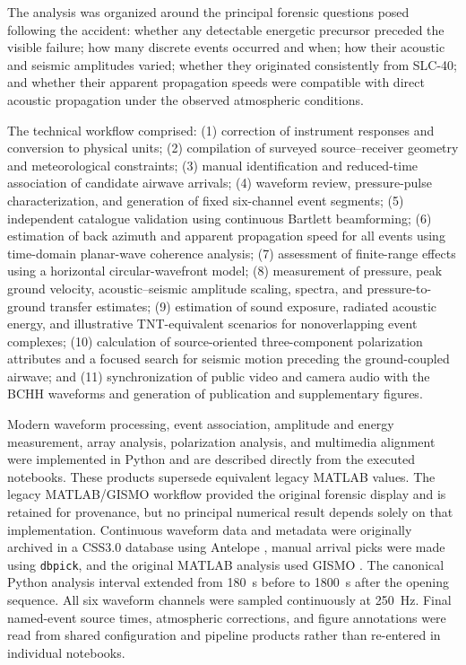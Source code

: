 \documentclass[]{seismica}
\begin{document}
The analysis was organized around the principal forensic questions posed
following the accident: whether any detectable energetic precursor preceded
the visible failure; how many discrete events occurred and when; how their
acoustic and seismic amplitudes varied; whether they originated consistently
from SLC-40; and whether their apparent propagation speeds were compatible with
direct acoustic propagation under the observed atmospheric conditions.

The technical workflow comprised:
(1) correction of instrument responses and conversion to physical units;
(2) compilation of surveyed source--receiver geometry and meteorological
constraints;
(3) manual identification and reduced-time association of candidate airwave
arrivals;
(4) waveform review, pressure-pulse characterization, and generation of fixed
six-channel event segments;
(5) independent catalogue validation using continuous Bartlett beamforming;
(6) estimation of back azimuth and apparent propagation speed for all events
using time-domain planar-wave coherence analysis;
(7) assessment of finite-range effects using a horizontal circular-wavefront
model;
(8) measurement of pressure, peak ground velocity, acoustic--seismic amplitude
scaling, spectra, and pressure-to-ground transfer estimates;
(9) estimation of sound exposure, radiated acoustic energy, and illustrative
TNT-equivalent scenarios for nonoverlapping event complexes;
(10) calculation of source-oriented three-component polarization attributes
and a focused search for seismic motion preceding the ground-coupled airwave;
and (11) synchronization of public video and camera audio with the BCHH
waveforms and generation of publication and supplementary figures.

Modern waveform processing, event association, amplitude and energy
measurement, array analysis, polarization analysis, and multimedia alignment
were implemented in Python and are described directly from the executed
notebooks. These products supersede equivalent legacy MATLAB values. The
legacy MATLAB/GISMO workflow provided the original forensic display and is
retained for provenance, but no principal numerical result depends solely on
that implementation. Continuous waveform data and
metadata were originally archived in a CSS3.0 database using Antelope
\citep{brtt_antelope}, manual arrival picks were made using
\texttt{dbpick}, and the original MATLAB analysis used GISMO
\citep{thompson_gismo_2017}. The canonical Python analysis interval extended from 180~s
before to 1800~s after the opening sequence. All six waveform channels were
sampled continuously at 250~Hz. Final named-event source times, atmospheric
corrections, and figure annotations were read from shared configuration and
pipeline products rather than re-entered in individual notebooks.
\end{document}
